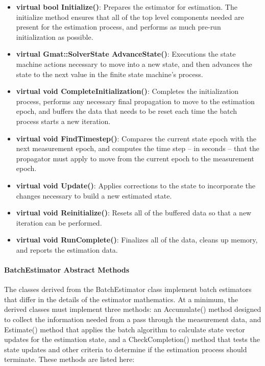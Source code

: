 \begin{itemize}
\item \textbf{virtual bool Initialize()}:  Prepares the estimator for estimation.  The initialize method ensures that all of the top level components needed are present for the estimation process, and performs as much pre-run initialization as possible.
\item \textbf{virtual Gmat::SolverState AdvanceState()}:  Executions the  state machine actions necessary to move into a new state, and then advances the state to the next value in the finite state machine's process.
\item \textbf{virtual void CompleteInitialization()}:  Completes the initialization process, performs any necessary final propagation to move to the estimation epoch, and buffers the data that needs to be reset each time the batch process starts a new iteration.
\item \textbf{virtual void FindTimestep()}:  Compares the current state epoch with the next measurement epoch, and computes the time step -- in seconds -- that the propagator must apply to move from the current epoch to the measurement epoch.
\item \textbf{virtual void Update()}:  Applies corrections to the state to incorporate the changes necessary to build a new estimated state.
\item \textbf{virtual void Reinitialize()}:  Resets all of the buffered data so that a new iteration can be performed.
\item \textbf{virtual void RunComplete()}:  Finalizes all of the data, cleans up memory, and reports the estimation data.
\end{itemize}

\paragraph{BatchEstimator Abstract Methods}

The classes derived from the BatchEstimator class implement batch estimators that differ in the details of the estimator mathematics.  At a minimum, the derived classes must implement three methods: an Accumulate() method designed to collect the information needed from a pass through the measurement data, and Estimate() method that applies the batch algorithm to calculate state vector updates for the estimation state, and a CheckCompletion() method that tests the state updates and other criteria to determine if the estimation process should terminate.  These methods are listed here:

